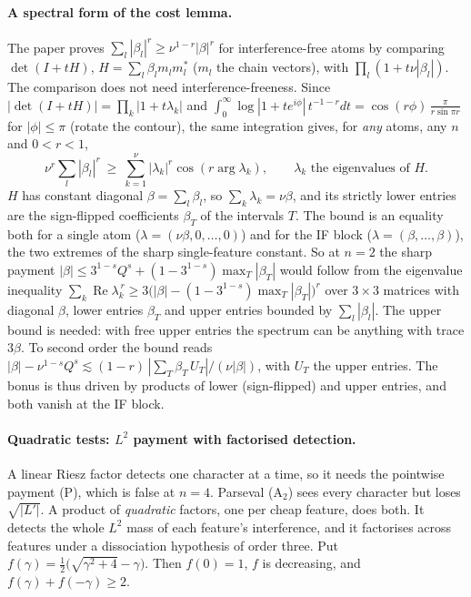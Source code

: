 \documentclass[11pt]{article}
\theoremstyle{definition}
\renewcommand{\Re}{\operatorname{Re}}
\begin{document}
\paragraph{A spectral form of the cost lemma.}  The paper proves $\sum_l|\beta_l|^r\ge\nu^{1-r}|\beta|^r$ for interference-free atoms by comparing
$\det(I+tH)$, $H=\sum_l\beta_lm_lm_l^*$ ($m_l$ the chain vectors), with $\prod_l(1+t\nu|\beta_l|)$.  The comparison does not need
interference-freeness.  Since $|\det(I+tH)|=\prod_k|1+t\lambda_k|$ and $\int_0^\infty\log|1+te^{i\phi}|\,t^{-1-r}dt=\cos(r\phi)\,\frac{\pi}{r\sin\pi r}$ for
$|\phi|\le\pi$ (rotate the contour), the same integration gives, for \emph{any} atoms, any $n$ and $0<r<1$,
\[\nu^r\sum_l|\beta_l|^r\ \ge\ \sum_{k=1}^{\nu}|\lambda_k|^r\cos(r\arg\lambda_k),\qquad\lambda_k\text{ the eigenvalues of }H .\]
$H$ has constant diagonal $\beta=\sum_l\beta_l$, so $\sum_k\lambda_k=\nu\beta$, and its strictly lower entries are the sign-flipped coefficients
$\beta_T$ of the intervals $T$.  The bound is an equality both for a single atom ($\lambda=(\nu\beta,0,\dots,0)$) and for the IF block
($\lambda=(\beta,\dots,\beta)$), the two extremes of the sharp single-feature constant.  So at $n=2$ the sharp payment
$|\beta|\le3^{1-s}Q^s+(1-3^{1-s})\max_T|\beta_T|$ would follow from the eigenvalue inequality $\sum_k\Re\lambda_k^{\,r}\ge3\big(|\beta|-(1-3^{1-s})\max_T|\beta_T|\big)^r$
over $3\times3$ matrices with diagonal $\beta$, lower entries $\beta_T$ and upper entries bounded by $\sum_l|\beta_l|$.  The upper bound is needed:
with free upper entries the spectrum can be anything with trace $3\beta$.  To second order the bound reads
$|\beta|-\nu^{1-s}Q^s\lesssim(1-r)\,|\sum_T\beta_T\,U_T|/(\nu|\beta|)$, with $U_T$ the upper entries.  The bonus is thus driven by products of
lower (sign-flipped) and upper entries, and both vanish at the IF block.

\paragraph{Quadratic tests: $L^2$ payment with factorised detection.}  A linear Riesz factor detects one character at a time, so it
needs the pointwise payment (P), which is false at $n=4$.  Parseval (A$_2$) sees every character but loses $\sqrt{|L'|}$.  A product
of \emph{quadratic} factors, one per cheap feature, does both.  It detects the whole $L^2$ mass of each feature's interference, and it
factorises across features under a dissociation hypothesis of order three.  Put $f(\gamma)=\frac12\big(\sqrt{\gamma^2+4}-\gamma\big)$.  Then $f(0)=1$, $f$ is decreasing, and
$f(\gamma)+f(-\gamma)\ge2$.
\end{document}
